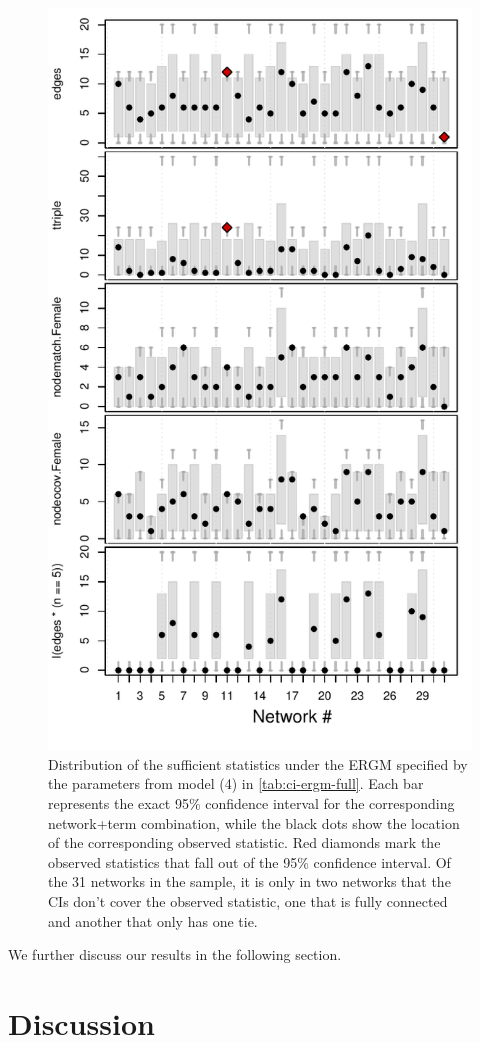 \documentclass[review, nonatbib,doubleblind]{elsarticle/elsarticle}
\begin{document}
\begin{figure}[p]
    \centering
    \includegraphics[width = .75\linewidth]{figures/ci-ergmito-gof-full.pdf}
    \caption{Distribution of the sufficient statistics under the ERGM specified by the parameters from model (4) in \autoref{tab:ci-ergm-full}. Each bar represents the exact 95\% confidence interval for the corresponding network+term combination, while the black dots show the location of the corresponding observed statistic. Red diamonds mark the observed statistics that fall out of the 95\% confidence interval. Of the 31 networks in the sample, it is only in two networks that the CIs don't cover the observed statistic, one that is fully connected and another that only has one tie.}
    \label{fig:ci-gof-full}
\end{figure}

We further discuss our results in the following section.


\section{Discussion}
\end{document}
